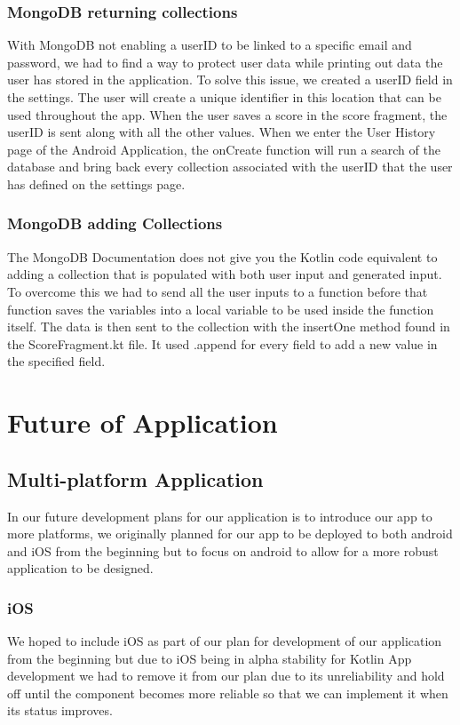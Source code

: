 \subsubsection{MongoDB returning collections}
With MongoDB not enabling a userID to be linked to a specific email and password, we had to find a way to protect user data while printing out data the user has stored in the application. To solve this issue, we created a userID field in the settings. The user will create a unique identifier in this location that can be used throughout the app. When the user saves a score in the score fragment, the userID is sent along with all the other values. When we enter the User History page of the Android Application, the onCreate function will run a search of the database and bring back every collection associated with the userID that the user has defined on the settings page.

\subsubsection{MongoDB adding Collections}
The MongoDB Documentation does not give you the Kotlin code equivalent to adding a collection that is populated with both user input and generated input. To overcome this we had to send all the user inputs to a function before that function saves the variables into a local variable to be used inside the function itself. The data is then sent to the collection with the insertOne method found in the ScoreFragment.kt file. It used .append for every field to add a new value in the specified field.
\section{Future of Application}
\subsection{Multi-platform Application}
In our future development plans for our application is to introduce our app to more platforms, we originally planned for our app to be deployed to both android and iOS from the beginning but to focus on android to allow for a more robust application to be designed.
\subsubsection{iOS}
We hoped to include iOS as part of our plan for development of our application from the beginning but due to iOS being in alpha stability for Kotlin App development\cite{ref2} we had to remove it from our plan due to its unreliability and hold off until the component becomes more reliable so that we can implement it when its status improves.
